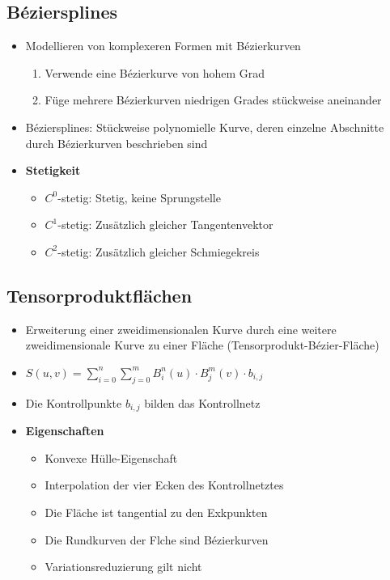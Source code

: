 \subsection{Béziersplines}
\begin{itemize}
	\item Modellieren von komplexeren Formen mit Bézierkurven
	\begin{enumerate}
		\item Verwende eine Bézierkurve von hohem Grad
		\item Füge mehrere Bézierkurven niedrigen Grades stückweise aneinander
	\end{enumerate}
	\item Béziersplines: Stückweise polynomielle Kurve, deren einzelne Abschnitte durch Bézierkurven beschrieben sind
	\item \textbf{Stetigkeit}
	\begin{itemize}
		\item \(C^0\)-stetig: Stetig, keine Sprungstelle
		\item \(C^1\)-stetig: Zusätzlich gleicher Tangentenvektor
		\item \(C^2\)-stetig: Zusätzlich gleicher Schmiegekreis
	\end{itemize}
\end{itemize}


\subsection{Tensorproduktflächen}
\begin{itemize}
	\item Erweiterung einer zweidimensionalen Kurve durch eine weitere zweidimensionale Kurve zu einer Fläche (Tensorprodukt-Bézier-Fläche)
	\item \(S(u,v) = \sum_{i=0}^n \sum_{j=0}^m B_i^n(u) \cdot B_j^m(v) \cdot b_{i,j}\)
	\item Die Kontrollpunkte \(b_{i,j}\) bilden das Kontrollnetz
	\item \textbf{Eigenschaften}
	\begin{itemize}
		\item Konvexe Hülle-Eigenschaft
		\item Interpolation der vier Ecken des Kontrollnetztes
		\item Die Fläche ist tangential zu den Exkpunkten
		\item Die Rundkurven der Flche sind Bézierkurven
		\item Variationsreduzierung gilt nicht
	\end{itemize}
\end{itemize}


